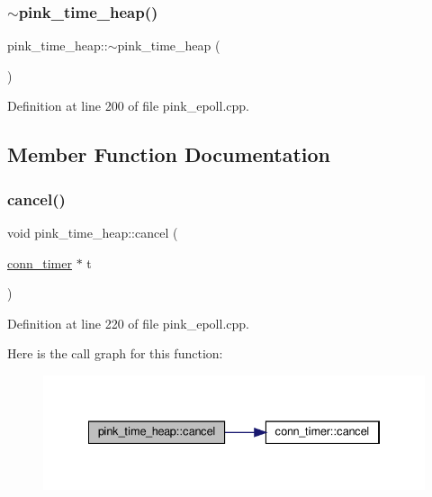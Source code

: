 \subsubsection{\texorpdfstring{$\sim$pink\+\_\+time\+\_\+heap()}{~pink\_time\_heap()}}
{\footnotesize\ttfamily pink\+\_\+time\+\_\+heap\+::$\sim$pink\+\_\+time\+\_\+heap (\begin{DoxyParamCaption}{ }\end{DoxyParamCaption})}



Definition at line 200 of file pink\+\_\+epoll.\+cpp.



\subsection{Member Function Documentation}
\mbox{\label{classpink__time__heap_a331d1f993efc7bd50f8e6d10e5f1c6ee}} 
\subsubsection{\texorpdfstring{cancel()}{cancel()}}
{\footnotesize\ttfamily void pink\+\_\+time\+\_\+heap\+::cancel (\begin{DoxyParamCaption}\item[{\hyperlink{classconn__timer}{conn\+\_\+timer} $\ast$}]{t }\end{DoxyParamCaption})}



Definition at line 220 of file pink\+\_\+epoll.\+cpp.

Here is the call graph for this function\+:
\nopagebreak
\begin{figure}[H]
\begin{center}
\leavevmode
\includegraphics[width=334pt]{classpink__time__heap_a331d1f993efc7bd50f8e6d10e5f1c6ee_cgraph}
\end{center}
\end{figure}
\mbox{\label{classpink__time__heap_ade64cf32193747380cb57c5709e28383}} 
